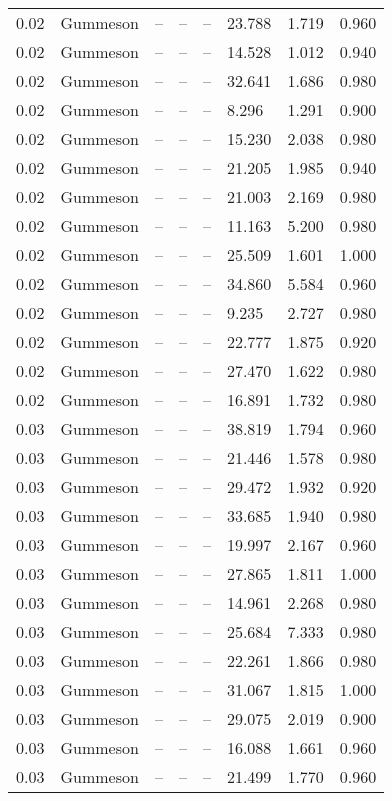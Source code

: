 \begin{table}[H]
\begin{tabular}{l c l l l}
0.02 & Gummeson & -- & -- & -- & 23.788 & 1.719 & 0.960 \\
0.02 & Gummeson & -- & -- & -- & 14.528 & 1.012 & 0.940 \\
0.02 & Gummeson & -- & -- & -- & 32.641 & 1.686 & 0.980 \\
0.02 & Gummeson & -- & -- & -- & 8.296 & 1.291 & 0.900 \\
0.02 & Gummeson & -- & -- & -- & 15.230 & 2.038 & 0.980 \\
0.02 & Gummeson & -- & -- & -- & 21.205 & 1.985 & 0.940 \\
0.02 & Gummeson & -- & -- & -- & 21.003 & 2.169 & 0.980 \\
0.02 & Gummeson & -- & -- & -- & 11.163 & 5.200 & 0.980 \\
0.02 & Gummeson & -- & -- & -- & 25.509 & 1.601 & 1.000 \\
0.02 & Gummeson & -- & -- & -- & 34.860 & 5.584 & 0.960 \\
0.02 & Gummeson & -- & -- & -- & 9.235 & 2.727 & 0.980 \\
0.02 & Gummeson & -- & -- & -- & 22.777 & 1.875 & 0.920 \\
0.02 & Gummeson & -- & -- & -- & 27.470 & 1.622 & 0.980 \\
0.02 & Gummeson & -- & -- & -- & 16.891 & 1.732 & 0.980 \\
0.03 & Gummeson & -- & -- & -- & 38.819 & 1.794 & 0.960 \\
0.03 & Gummeson & -- & -- & -- & 21.446 & 1.578 & 0.980 \\
0.03 & Gummeson & -- & -- & -- & 29.472 & 1.932 & 0.920 \\
0.03 & Gummeson & -- & -- & -- & 33.685 & 1.940 & 0.980 \\
0.03 & Gummeson & -- & -- & -- & 19.997 & 2.167 & 0.960 \\
0.03 & Gummeson & -- & -- & -- & 27.865 & 1.811 & 1.000 \\
0.03 & Gummeson & -- & -- & -- & 14.961 & 2.268 & 0.980 \\
0.03 & Gummeson & -- & -- & -- & 25.684 & 7.333 & 0.980 \\
0.03 & Gummeson & -- & -- & -- & 22.261 & 1.866 & 0.980 \\
0.03 & Gummeson & -- & -- & -- & 31.067 & 1.815 & 1.000 \\
0.03 & Gummeson & -- & -- & -- & 29.075 & 2.019 & 0.900 \\
0.03 & Gummeson & -- & -- & -- & 16.088 & 1.661 & 0.960 \\
0.03 & Gummeson & -- & -- & -- & 21.499 & 1.770 & 0.960 \\

\end{tabular}
\end{table}
